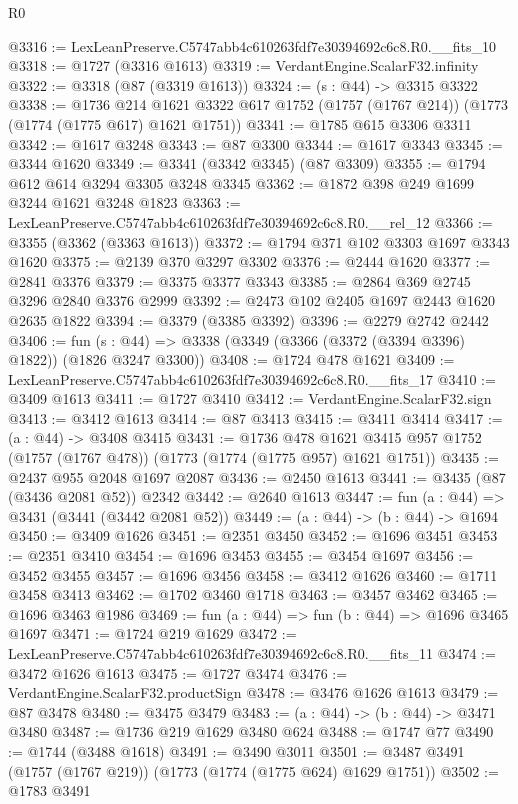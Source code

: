 \begin{lexlean}{R0}
\begin{coremodule}
@3316 := LexLeanPreserve.C5747abb4c610263fdf7e30394692c6c8.R0.__fits_10
@3318 := @1727 (@3316 @1613)
@3319 := VerdantEngine.ScalarF32.infinity
@3322 := @3318 (@87 (@3319 @1613))
@3324 := (s : @44) -> @3315 @3322
@3338 := @1736
    @214
    @1621
    @3322
    @617
    @1752
    (@1757 (@1767 @214))
    (@1773 (@1774 (@1775 @617) @1621 @1751))
@3341 := @1785 @615 @3306 @3311
@3342 := @1617 @3248
@3343 := @87 @3300
@3344 := @1617 @3343
@3345 := @3344 @1620
@3349 := @3341 (@3342 @3345) (@87 @3309)
@3355 := @1794 @612 @614 @3294 @3305 @3248 @3345
@3362 := @1872 @398 @249 @1699 @3244 @1621 @3248 @1823
@3363 := LexLeanPreserve.C5747abb4c610263fdf7e30394692c6c8.R0.__rel_12
@3366 := @3355 (@3362 (@3363 @1613))
@3372 := @1794 @371 @102 @3303 @1697 @3343 @1620
@3375 := @2139 @370 @3297 @3302
@3376 := @2444 @1620
@3377 := @2841 @3376
@3379 := @3375 @3377 @3343
@3385 := @2864 @369 @2745 @3296 @2840 @3376 @2999
@3392 := @2473 @102 @2405 @1697 @2443 @1620 @2635 @1822
@3394 := @3379 (@3385 @3392)
@3396 := @2279 @2742 @2442
@3406 := fun (s : @44) => @3338 (@3349 (@3366 (@3372 (@3394 @3396) @1822)) (@1826 @3247 @3300))
@3408 := @1724 @478 @1621
@3409 := LexLeanPreserve.C5747abb4c610263fdf7e30394692c6c8.R0.__fits_17
@3410 := @3409 @1613
@3411 := @1727 @3410
@3412 := VerdantEngine.ScalarF32.sign
@3413 := @3412 @1613
@3414 := @87 @3413
@3415 := @3411 @3414
@3417 := (a : @44) -> @3408 @3415
@3431 := @1736
    @478
    @1621
    @3415
    @957
    @1752
    (@1757 (@1767 @478))
    (@1773 (@1774 (@1775 @957) @1621 @1751))
@3435 := @2437 @955 @2048 @1697 @2087
@3436 := @2450 @1613
@3441 := @3435 (@87 (@3436 @2081 @52)) @2342
@3442 := @2640 @1613
@3447 := fun (a : @44) => @3431 (@3441 (@3442 @2081 @52))
@3449 := (a : @44) -> (b : @44) -> @1694
@3450 := @3409 @1626
@3451 := @2351 @3450
@3452 := @1696 @3451
@3453 := @2351 @3410
@3454 := @1696 @3453
@3455 := @3454 @1697
@3456 := @3452 @3455
@3457 := @1696 @3456
@3458 := @3412 @1626
@3460 := @1711 @3458 @3413
@3462 := @1702 @3460 @1718
@3463 := @3457 @3462
@3465 := @1696 @3463 @1986
@3469 := fun (a : @44) => fun (b : @44) => @1696 @3465 @1697
@3471 := @1724 @219 @1629
@3472 := LexLeanPreserve.C5747abb4c610263fdf7e30394692c6c8.R0.__fits_11
@3474 := @3472 @1626 @1613
@3475 := @1727 @3474
@3476 := VerdantEngine.ScalarF32.productSign
@3478 := @3476 @1626 @1613
@3479 := @87 @3478
@3480 := @3475 @3479
@3483 := (a : @44) -> (b : @44) -> @3471 @3480
@3487 := @1736 @219 @1629 @3480 @624
@3488 := @1747 @77
@3490 := @1744 (@3488 @1618)
@3491 := @3490 @3011
@3501 := @3487 @3491 (@1757 (@1767 @219)) (@1773 (@1774 (@1775 @624) @1629 @1751))
@3502 := @1783 @3491

\end{coremodule}
\end{lexlean}
